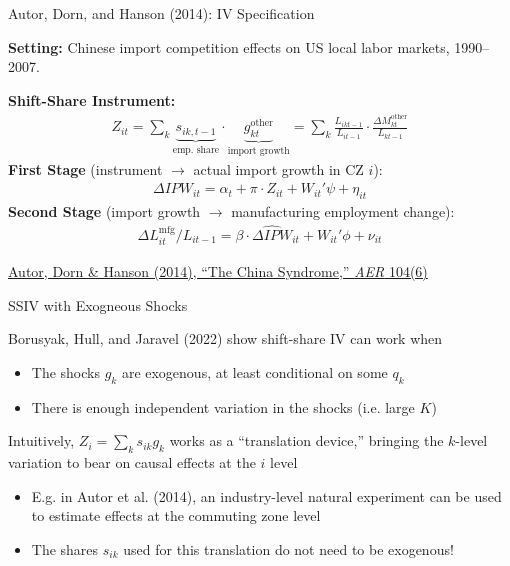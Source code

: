 \documentclass{beamer}
\begin{document}
\begin{frame}{Autor, Dorn, and Hanson (2014): IV Specification}
{\small
\textbf{Setting:} Chinese import competition effects on US local labor markets, 1990--2007.\medskip

\textbf{Shift-Share Instrument:}
\vspace{-0.3cm}
\begin{align*}
Z_{it} = \sum_{k} \underbrace{s_{ik,t-1}}_{\text{emp. share}} \cdot \underbrace{g_{kt}^{\text{other}}}_{\text{import growth}} = \sum_k \frac{L_{ikt-1}}{L_{it-1}} \cdot \frac{\Delta M_{kt}^{\text{other}}}{L_{kt-1}}
\end{align*}
\vspace{-0.5cm}
\textbf{First Stage} (instrument $\to$ actual import growth in CZ $i$):
\vspace{-0.3cm}
\begin{align*}
\Delta IPW_{it} = \alpha_t + \pi \cdot Z_{it} + W_{it}'\psi + \eta_{it}
\end{align*}
\vspace{-0.5cm}
\textbf{Second Stage} (import growth $\to$ manufacturing employment change):
\vspace{-0.3cm}
\begin{align*}
\Delta L_{it}^{\text{mfg}} / L_{it-1} = \beta \cdot \widehat{\Delta IPW}_{it} + W_{it}'\phi + \nu_{it}
\end{align*}
}
{\scriptsize \textcolor{asher}{\href{https://www.aeaweb.org/articles?id=10.1257/aer.104.6.1553}{Autor, Dorn \& Hanson (2014), ``The China Syndrome,'' \emph{AER} 104(6)}}}
\end{frame}

\begin{frame}{SSIV with Exogneous Shocks}

Borusyak, Hull, and Jaravel (2022) show shift-share IV can work when
\begin{itemize}
\item The shocks $g_k$ are exogenous, at least conditional on some $q_k$
\item There is enough independent variation in the shocks (i.e. large $K$)
\end{itemize}\bigskip\pause{}

Intuitively, $Z_i=\sum_k s_{ik}g_{k}$ works as a ``translation device,'' bringing the $k$-level variation to bear on causal effects at the $i$ level
\begin{itemize}
\item E.g. in Autor et al. (2014), an industry-level natural experiment can be used to estimate effects at the commuting zone level
\item The shares $s_{ik}$ used for this translation do not need to be exogenous!
\end{itemize}

\end{frame}
\end{document}
